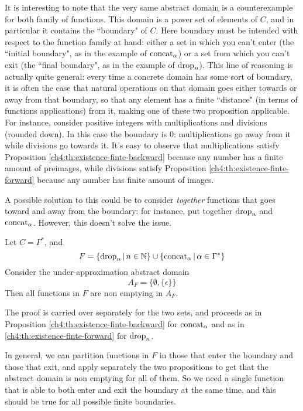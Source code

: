 It is interesting to note that the very same abstract domain is a counterexample for both family of functions. This domain is a power set of elements of $C$, and in particular it contains the ``boundary" of $C$. Here boundary must be intended with respect to the function family at hand: either a set in which you can't enter (the ``initial boundary", as in the example of $\text{concat}_{\alpha}$) or a set from which you can't exit (the ``final boundary", as in the example of $\text{drop}_n$).
This line of reasoning is actually quite general: every time a concrete domain has some sort of boundary, it is often the case that natural operations on that domain goes either towards or away from that boundary, so that any element has a finite ``distance" (in terms of functions applications) from it, making one of these two proposition applicable.
For instance, consider positive integers with multiplications and divisions (rounded down). In this case the boundary is $0$: multiplications go away from it while divisions go towards it. It's easy to observe that multiplications satisfy Proposition \ref{ch4:th:existence-finte-backward} because any number has a finite amount of preimages, while divisions satisfy Proposition \ref{ch4:th:existence-finte-forward} because any number has finite amount of images.

A possible solution to this could be to consider \textit{together} functions that goes toward and away from the boundary: for instance, put together $\text{drop}_n$ and $\text{concat}_{\alpha}$. However, this doesn't solve the issue.
\begin{example}
	Let $C = \Gamma^*$, and
	\[
	F = \{ \text{drop}_n \,\vert\, n \in \mathbb{N} \} \cup \{ \text{concat}_{\alpha} \,\vert\, \alpha \in \Gamma^* \}
	\]
	Consider the under-approximation abstract domain
	\[
	A_F = \{ \emptyset, \{ \epsilon \} \}
	\]
	Then all functions in $F$ are non emptying in $A_F$.

	The proof is carried over separately for the two sets, and proceeds as in Proposition \ref{ch4:th:existence-finte-backward} for $\text{concat}_{\alpha}$ and as in \ref{ch4:th:existence-finte-forward} for $\text{drop}_n$.
\end{example}
In general, we can partition functions in $F$ in those that enter the boundary and those that exit, and apply separately the two propositions to get that the abstract domain is non emptying for all of them. So we need a single function that is able to both enter and exit the boundary at the same time, and this should be true for all possible finite boundaries.

